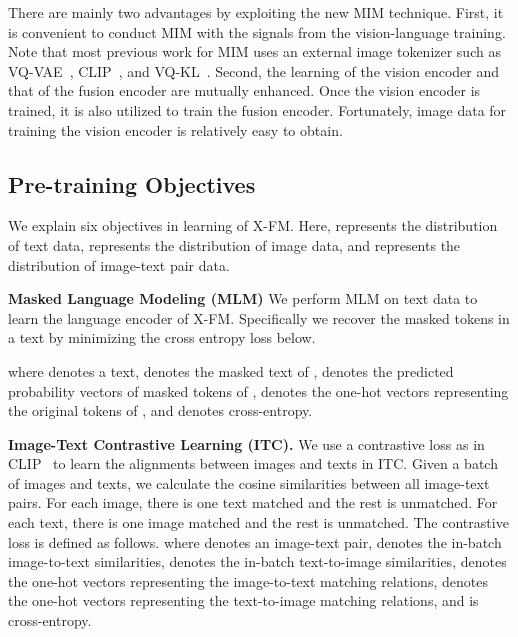 \documentclass[11pt]{article}
\newcommand{\ModelName}{X-FM\xspace}
\begin{document}
There are mainly two advantages by exploiting the new MIM technique. First, it is convenient to conduct MIM with the signals from the vision-language training. Note that most previous work for MIM uses an external image tokenizer such as VQ-VAE~\citep{bao2021beit,singh2021flava}, CLIP~\citep{wei2022mvp}, and VQ-KL~\citep{peng2022beit}.
Second, the learning of the vision encoder and that of the fusion encoder are mutually enhanced. Once the vision encoder is trained, it is also utilized to train the fusion encoder. Fortunately, image data for training the vision encoder is relatively easy to obtain. 

\subsection{Pre-training Objectives}
\label{sec:objectives}

We explain six objectives in learning of {\ModelName}. Here,  represents the distribution of text data,  represents the distribution of image data, and  represents the distribution of image-text pair data.

{\bf Masked Language Modeling (MLM)}
We perform MLM on text data to learn the language encoder of {\ModelName}. Specifically we recover the masked tokens in a text by minimizing the cross entropy loss below.
{\setlength\abovedisplayskip{-0.2cm}
\setlength\belowdisplayskip{0.2cm}
}

where  denotes a text,  denotes the masked text of ,  denotes the predicted probability vectors of masked tokens of ,  denotes the one-hot vectors representing the original tokens of , and  denotes cross-entropy. 

{\bf Image-Text Contrastive Learning (ITC).}
We use a contrastive loss as in CLIP~\citep{DBLP:conf/icml/RadfordKHRGASAM21} to learn the alignments between images and texts in ITC. Given a batch of images and texts, we calculate the cosine similarities between all image-text pairs. For each image, there is one text matched and the rest is unmatched. For each text, there is one image matched and the rest is unmatched. The contrastive loss is defined as follows.
{\setlength\abovedisplayskip{-0.2cm}
\setlength\belowdisplayskip{0.2cm}
}
where  denotes an image-text pair,  denotes the in-batch image-to-text similarities,  denotes the in-batch text-to-image similarities,  denotes the one-hot vectors representing the image-to-text matching relations,  denotes the one-hot vectors representing the text-to-image matching relations, and  is cross-entropy.
\end{document}
